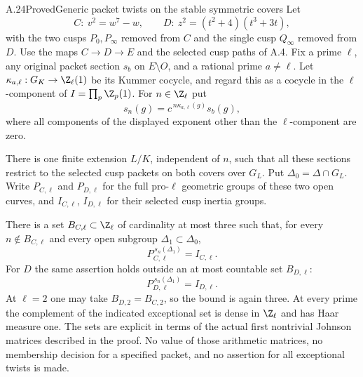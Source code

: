 \begin{statement}{A.24}{Proved}{Generic packet twists on the stable symmetric covers}
Let
\[
 C:\ v^2=w^7-w,\qquad
 D:\ z^2=(t^2+4)(t^3+3t),
\]
with the two cusps $P_0,P_\infty$ removed from $C$ and the single
cusp $Q_\infty$ removed from $D$. Use the maps
$C\to D\to E$ and the selected cusp paths of A.4. Fix a prime
$\ell$, any original packet section $s_b$ on $E\setminus O$,
and a rational prime $a\ne\ell$. Let
$\kappa_{a,\ell}:G_K\to\Z_\ell(1)$ be its Kummer cocycle, and
regard this as a cocycle in the $\ell$-component of
$I=\prod_p\Z_p(1)$. For $n\in\Z_\ell$ put
\[
 s_n(g)=c^{\,n\kappa_{a,\ell}(g)}s_b(g),
                                                        \tag{A.24.1}
\]
where all components of the displayed exponent other than the
$\ell$-component are zero.

There is one finite extension $L/K$, independent of $n$, such
that all these sections restrict to the selected cusp packets
on both covers over $G_L$. Put $\Delta_0=\Delta\cap G_L$.
Write $P_{C,\ell}$ and $P_{D,\ell}$ for the full pro-$\ell$
geometric groups of these two open curves, and $I_{C,\ell}$,
$I_{D,\ell}$ for their selected cusp inertia groups.

There is a set $B_{C,\ell}\subset\Z_\ell$ of cardinality at most
three such that, for every $n\notin B_{C,\ell}$ and every open
subgroup $\Delta_1\subset\Delta_0$,
\[
             P_{C,\ell}^{\,s_n(\Delta_1)}=I_{C,\ell}.
                                                        \tag{A.24.2}
\]
For $D$ the same assertion holds outside an at most countable
set $B_{D,\ell}$:
\[
             P_{D,\ell}^{\,s_n(\Delta_1)}=I_{D,\ell}.
                                                        \tag{A.24.3}
\]
At $\ell=2$ one may take $B_{D,2}=B_{C,2}$, so the bound is
again three. At every prime the complement of the indicated
exceptional set is dense in $\Z_\ell$ and has Haar measure one.
The sets are explicit in terms of the actual first nontrivial
Johnson matrices described in the proof. No value of those
arithmetic matrices, no membership decision for a specified
packet, and no assertion for all exceptional twists is made.
\end{statement}
